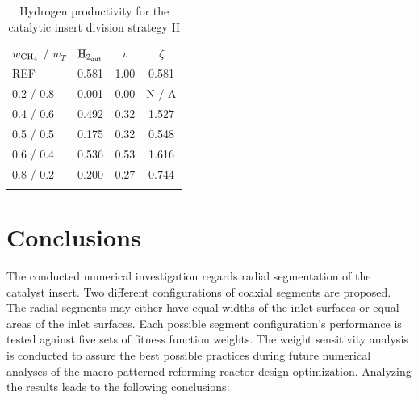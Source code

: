 \documentclass[preprint,12pt]{elsarticle}
\begin{document}

\begin{center}
\begin{table}
\centering
\caption{Hydrogen productivity for the catalytic insert division strategy II}
\label{tab:5RH2prod}
\begin{tabular}{l|c|c|c}
\hline\noalign{\smallskip}
 $w_{\rm{CH_4}}$ / $ w_T $ & $\rm{H_{2_{out}}}$ & $\iota$ & $\zeta$ \\
\noalign{\smallskip}\hline\noalign{\smallskip}
REF         & 0.581     & 1.00  &  0.581\\
0.2 / 0.8   & 0.001     & 0.00  & N / A \\
0.4 / 0.6   & 0.492     & 0.32  & 1.527 \\
0.5 / 0.5   & 0.175     & 0.32  & 0.548 \\
0.6 / 0.4   & 0.536     & 0.53  & 1.616 \\
0.8 / 0.2   & 0.200     & 0.27  & 0.744 \\
\noalign{\smallskip}\hline
\end{tabular}
\end{table}
\end{center}

\clearpage


\section{Conclusions}

The conducted numerical investigation regards radial segmentation of the catalyst insert. Two different configurations of coaxial segments are proposed. The radial segments may either have equal widths of the inlet surfaces or equal areas of the inlet surfaces. Each possible segment configuration's performance is tested against five sets of fitness function weights. The weight sensitivity analysis is conducted to assure the best possible practices during future numerical analyses of the macro-patterned reforming reactor design optimization. Analyzing the results leads to the following conclusions:
\end{document}
